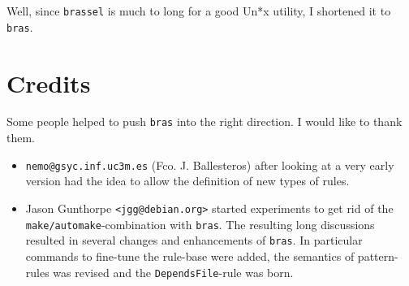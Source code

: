 \documentclass[12pt]{article}
\newcommand{\bras}{\texttt{bras}}
\begin{document}
Well, since \texttt{brassel} is much to long for a good
Un*x utility, I shortened it to \bras.

\section{Credits}

Some people helped to push \bras{} into the right direction. I
would like to thank them. 

\begin{itemize}
\item \texttt{nemo@gsyc.inf.uc3m.es} (Fco. J. Ballesteros) after
looking at a very early version had the
idea to allow the definition of new types of rules.

\item Jason Gunthorpe \texttt{<jgg@debian.org>} started
experiments to get rid of the \texttt{make/automake}-combination with
\bras{}. The resulting long discussions resulted in several changes
and enhancements of \bras{}. In particular commands to fine-tune the
rule-base were added, the semantics of pattern-rules was revised and
the \texttt{DependsFile}-rule was born.
\end{itemize}
\end{document}

